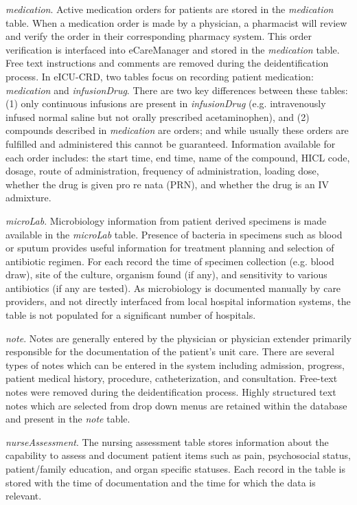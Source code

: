 \documentclass[english]{article}
\newcommand{\tblname}[1]{\emph{#1}}
\begin{document}
\tblname{medication}. Active medication orders for patients are stored in the \tblname{medication} table.
When a medication order is made by a physician, a pharmacist will review and verify the order in their corresponding pharmacy system. This order verification is interfaced into eCareManager and stored in the \tblname{medication} table. Free text instructions and comments are removed during the deidentification process.
In eICU-CRD, two tables focus on recording patient medication: \tblname{medication} and \tblname{infusionDrug}.
There are two key differences between these tables: (1) only continuous infusions are present in \tblname{infusionDrug} (e.g. intravenously infused normal saline but not orally prescribed acetaminophen), and (2) compounds described in \tblname{medication} are orders; and while usually these orders are fulfilled and administered this cannot be guaranteed. Information available for each order includes: the start time, end time, name of the compound, HICL code, dosage, route of administration, frequency of administration, loading dose, whether the drug is given pro re nata (PRN), and whether the drug is an IV admixture.

\tblname{microLab}. Microbiology information from patient derived specimens is made available in the \tblname{microLab} table. Presence of bacteria in specimens such as blood or sputum provides useful information for treatment planning and selection of antibiotic regimen. For each record the time of specimen collection (e.g. blood draw), site of the culture, organism found (if any), and sensitivity to various antibiotics (if any are tested).
As microbiology is documented manually by care providers, and not directly interfaced from local hospital information systems, the table is not populated for a significant number of hospitals.

\tblname{note}. Notes are generally entered by the physician or physician extender primarily responsible for the documentation of the patient's unit care. There are several types of notes which can be entered in the system including admission, progress, patient medical history, procedure, catheterization, and consultation. Free-text notes were removed during the deidentification process. Highly structured text notes which are selected from drop down menus are retained within the database and present in the \tblname{note} table.

\tblname{nurseAssessment}. The nursing assessment table stores information about the capability to assess and document patient items such as pain, psychosocial status, patient/family education, and organ specific statuses. Each record in the table is stored with the time of documentation and the time for which the data is relevant.
\end{document}
